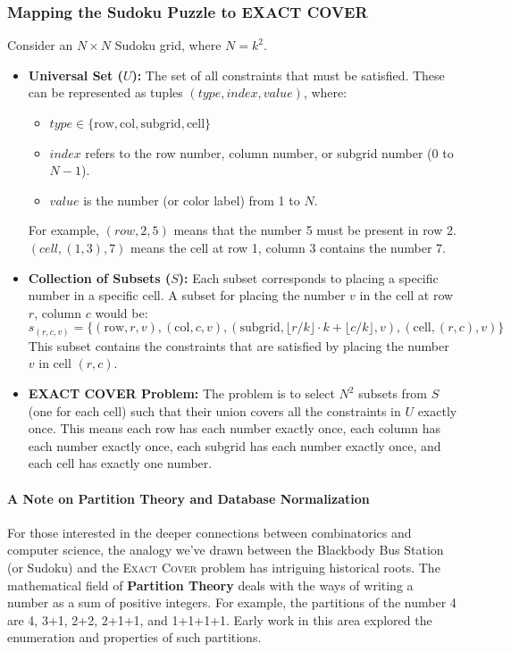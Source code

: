 \documentclass{report}
\begin{document}
\subsubsection*{Mapping the Sudoku Puzzle to EXACT COVER}

Consider an \(N \times N\) Sudoku grid, where \(N = k^2\).

\begin{itemize}
    \item \textbf{Universal Set (\(U\)):} The set of all constraints that must be satisfied. These can be represented as tuples \((type, index, value)\), where:
    \begin{itemize}
        \item \(type \in \{\text{row}, \text{col}, \text{subgrid}, \text{cell}\}\)
        \item \(index\) refers to the row number, column number, or subgrid number (0 to \(N-1\)).
        \item \(value\) is the number (or color label) from 1 to \(N\).
    \end{itemize}
    For example, \((row, 2, 5)\) means that the number 5 must be present in row 2. \((cell, (1,3), 7)\) means the cell at row 1, column 3 contains the number 7.

    \item \textbf{Collection of Subsets (\(S\)):} Each subset corresponds to placing a specific number in a specific cell. A subset for placing the number \(v\) in the cell at row \(r\), column \(c\) would be:
    \[
    s_{(r,c,v)} = \{(\text{row}, r, v), (\text{col}, c, v), (\text{subgrid}, \lfloor r/k \rfloor \cdot k + \lfloor c/k \rfloor, v), (\text{cell}, (r,c), v)\}
    \]
    This subset contains the constraints that are satisfied by placing the number \(v\) in cell \((r, c)\).

    \item \textbf{EXACT COVER Problem:} The problem is to select \(N^2\) subsets from \(S\) (one for each cell) such that their union covers all the constraints in \(U\) exactly once. This means each row has each number exactly once, each column has each number exactly once, each subgrid has each number exactly once, and each cell has exactly one number.
\end{itemize}

\paragraph*{A Note on Partition Theory and Database Normalization}
For those interested in the deeper connections between combinatorics and computer science, the analogy we've drawn between the Blackbody Bus Station (or Sudoku) and the \textsc{Exact Cover} problem has intriguing historical roots. The mathematical field of \textbf{Partition Theory} deals with the ways of writing a number as a sum of positive integers. For example, the partitions of the number 4 are 4, 3+1, 2+2, 2+1+1, and 1+1+1+1. Early work in this area explored the enumeration and properties of such partitions.
\end{document}
